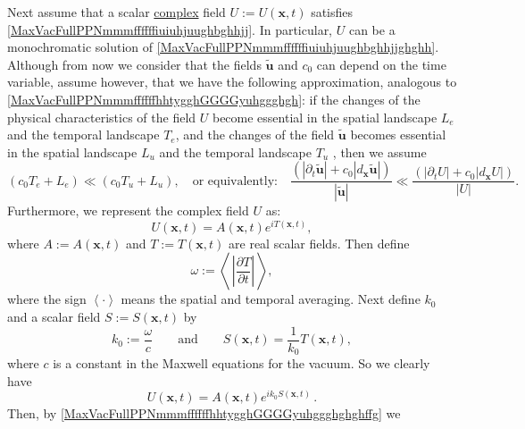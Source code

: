 \documentclass{article}
\theoremstyle{definition}
\theoremstyle{remark}
\renewcommand{\vec}[1]{\mathbf{#1}}
\newcommand{\er}{\eqref}
\newcommand{\er}{\eqref}
\begin{document}
Next assume that a scalar \underline{complex} field $U:=U(\vec x,t)$
satisfies \er{MaxVacFullPPNmmmffffffiuiuhjuughbghhjj}. In
particular, $U$ can be a monochromatic solution of
\er{MaxVacFullPPNmmmffffffiuiuhjuughbghhjjghghh}. Although from now
we consider that the fields $\vec {\tilde u}$ and $c_0$ can depend
on the time variable, assume however, that we have the following
approximation, analogous to
\er{MaxVacFullPPNmmmffffffhhtygghGGGGyuhggghgh}: if the changes of
the physical characteristics of the field $U$ become essential in
the spatial landscape $L_e$ and the temporal landscape $T_e$, and
the changes of the field $\vec {\tilde u}$ becomes essential in the
spatial landscape $L_{u}$ and the temporal landscape $T_{u}$ , then
we assume
\begin{equation}\label{MaxVacFullPPNmmmffffffhhtygghGGGGyuhggghghghffg}
\left(c_0T_e+L_e\right)\ll \left(c_0T_u+L_u\right),\quad\text{or
equivalently:}\quad \frac{\left(|\partial_t\vec {\tilde u}|+c_0|
d_{\vec x}\vec {\tilde u}|\right)}{|\vec {\tilde
u}|}\ll\frac{\left(|\partial_t U|+c_0| d_{\vec x}U|\right)}{|U|}.
\end{equation}
Furthermore, we represent the complex field $U$ as:
\begin{equation}\label{MaxVacFullPPNmmmffffffiuiuhjuughbghhuiiujjjjjjjj}
U(\vec x,t)=A(\vec x,t)e^{iT(\vec x,t)},
\end{equation}
where $A:=A(\vec x,t)$ and $T:=T(\vec x,t)$ are real scalar fields.
Then define
\begin{equation}\label{MaxVacFullPPNmmmffffffiuiuhjuughbghhuiiujjjjjjjjhhhjjj}
\omega:=\left<\,\left|\frac{\partial T}{\partial t}\right|\,\right>,
\end{equation}
where the sign $\left<\cdot\right>$ means the spatial and temporal
averaging. Next define $k_0$ and a scalar field $S:=S(\vec x,t)$ by
\begin{equation}\label{MaxVacFullPPNmmmffffffiuiuhjuughbghhuiiujjjjjjjjhhhjjjkk}
k_0:=\frac{\omega}{c}\quad\quad\text{and}\quad\quad S(\vec
x,t)=\frac{1}{k_0}T(\vec x,t),
\end{equation}
where $c$ is a constant in the Maxwell equations for the vacuum. So
we clearly have
\begin{equation}\label{MaxVacFullPPNmmmffffffiuiuhjuughbghhuiiujj}
U(\vec x,t)=A(\vec x,t)e^{ik_0S(\vec x,t)}\,.
\end{equation}
Then, by \er{MaxVacFullPPNmmmffffffhhtygghGGGGyuhggghghghffg} we
\end{document}
